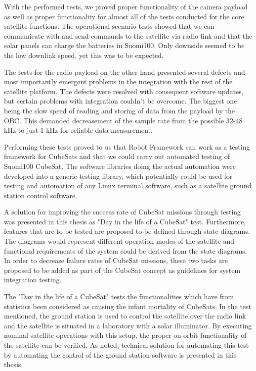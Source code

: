 \documentclass[english,12pt,a4paper,pdftex,elec,utf8]{aaltothesis}
\begin{document}
With the performed tests, we proved proper functionality of the camera payload as well as proper functionality for almost all of the tests conducted for the core satellite functions.   The operational scenario tests showed that we can communicate with and send commands to the satellite via radio link and that the solar panels can charge the batteries in Suomi100. Only downside seemed to be the low downlink speed, yet this was to be expected.\par 
The tests for the radio payload on the other hand presented several defects and most importantly emergent problems in the integration with the rest of the satellite platform. The defects were resolved with consequent software updates, but certain problems with integration couldn't be overcome. The biggest one being the slow speed of reading and storing of data from the payload by the OBC. This demanded decreasement of the sample rate from the possible 32-48 kHz to just 1 kHz for reliable data measurement.\par  
Performing these tests proved to us that Robot Framework can work as a testing framework for CubeSats and that we could carry out automated testing of Suomi100 CubeSat. The software libraries doing the actual automation were developed into a generic testing library, which potentially could be used for testing and automation of any Linux terminal software, such as a satellite ground station control software.\par 
A solution for improving the success rate of CubeSat missions through testing was presented in this thesis as "Day in the life of a CubeSat" test. Furthermore, features that are to be tested are proposed to be defined through state diagrams. The diagrams would represent different operation modes of the satellite and functional requirements of the system could be derived from the state diagrams. In order to decrease failure rates of CubeSat missions, these two tasks are proposed to be added as part of the CubeSat concept as guidelines for system integration testing. \par 
The "Day in the life of a CubeSat" tests the functionalities which have from statistics been considered as causing the infant mortality of CubeSats. In the test mentioned, the ground station is used to control the satellite over the radio link and the satellite is situated in a laboratory with a solar illuminator. By executing nominal satellite operations with this setup, the proper on-orbit functionality of the satellite can be verified. As noted, technical solution for automating this test by automating the control of the ground station software is presented in this thesis.
\end{document}
